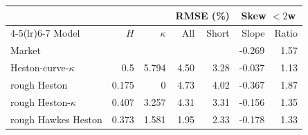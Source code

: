 \begin{tabular}{lrrrrrr}
\toprule
 & & & \multicolumn{2}{c}{RMSE (\%)} & \multicolumn{2}{c}{Skew $<2$w}\\
\cmidrule(lr){4-5}\cmidrule(lr){6-7}
Model & $H$ & $\kappa$ & All & Short & Slope & Ratio\\
\midrule
Market & & & & & -0.269 & 1.57\\
\addlinespace
Heston-curve-$\kappa$ & 0.5 & 5.794 & 4.50 & 3.28 & -0.037 & 1.13\\
rough Heston & 0.175 & 0 & 4.73 & 4.02 & -0.367 & 1.87\\
rough Heston-$\kappa$ & 0.407 & 3.257 & 4.31 & 3.31 & -0.156 & 1.35\\
rough Hawkes Heston & 0.373 & 1.581 & 1.95 & 2.33 & -0.178 & 1.33\\
\bottomrule
\end{tabular}
